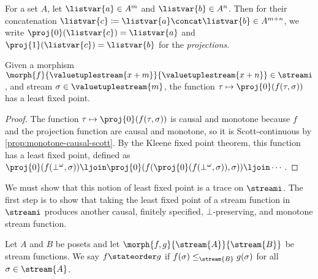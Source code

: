 \documentclass{lmcs}
\begin{document}
\begin{nota}[Projection]
    For a set \(A\), let \(\listvar{a} \in A^m\) and \(\listvar{b} \in A^n\).
    Then for their concatenation \(
    \listvar{c} \coloneqq \listvar{a} \concat \listvar{b} \in A^{m+n}\),
    we write \(\proj{0}(\listvar{c}) = \listvar{a}\) and
    \(\proj{1}(\listvar{c}) = \listvar{b}\) for the \emph{projections}.
\end{nota}

\begin{lem}\label{lem:lfp-stream-function}
    Given a morphism \(
    \morph{f}{\valuetuplestream{x+m}}{\valuetuplestream{x+n}}
    \in \streami
    \), and stream \(\sigma \in \valuetuplestream{m}\), the function \(
    \tau \mapsto \proj{0}\mleft(f(\tau,\sigma)\mright)
    \) has a least fixed point.
\end{lem}
\begin{proof}
    The function \(\tau \mapsto \proj{0}\mleft(f(\tau,\sigma)\mright)\) is
    causal and monotone because \(f\) and the projection function are
    causal and monotone, so it is Scott-continuous by
    \autoref{prop:monotone-causal-scott}.
    By the Kleene fixed point theorem, this function has a least fixed point,
    defined as \(
    \proj{0}\mleft(f(\bot^\omega, \sigma)\mright) \ljoin
    \proj{0}\mleft(f(\proj{0}\mleft(f(\bot^\omega, \sigma)\mright), \sigma)\mright) \ljoin
    \cdots
    \).
\end{proof}

We must show that this notion of least fixed point is a trace on \(\streami\).
The first step is to show that taking the least fixed point of a stream function
in \(\streami\) produces another causal, finitely specified,
\(\bot\)-preserving, and monotone stream function.

\begin{defi}\label{def:state-order}
    Let \(A\) and \(B\) be posets and let
    \(\morph{f, g}{\stream{A}}{\stream{B}}\) be stream functions.
    We say \(f \stateorder g\) if \(f(\sigma) \leq_{\stream{B}} g(\sigma)\)
    for all \(\sigma \in \stream{A}\).
\end{defi}
\end{document}
